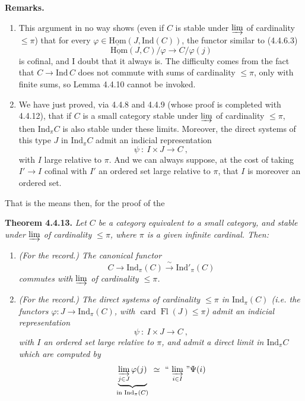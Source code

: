 \documentclass[11pt]{article}
\newcommand{\msp}[1]{\marginpar{\footnotesize [#1]}}
\newcommand{\uHom}{\underline{\mathrm{Hom}}}
\newcommand{\Ind}{\mathrm{Ind}}
\newcommand{\Fl}{\operatorname{Fl}}
\newcommand{\card}{\operatorname{card}}
\begin{document}
\textbf{Remarks.}
\begin{enumerate}[label={}, leftmargin=*]
\item[1.] This argument in no way shows (even if $C$ is stable under $\varinjlim$ of cardinality $\leqslant \pi$) that for every $\varphi \in \uHom(J,\Ind(C))$, the functor similar to (4.4.6.3)
\[
\uHom(J,C)/\varphi \longrightarrow C/\varphi(j)
\]
is cofinal, and I doubt that it always is. The difficulty comes from the fact that $C \longrightarrow \Ind\, C$ does not commute with sums of cardinality $\leqslant \pi$, only with finite sums,
\msp{page 95}
so Lemma 4.4.10 cannot be invoked.
\item[2.] We have just proved, via 4.4.8 and 4.4.9 (whose proof is completed with 4.4.12), that if $C$ is a small category stable under $\varinjlim$ of cardinality $\leqslant \pi$, then $\Ind_\pi C$ is also stable under these limits. Moreover, the direct systems of this type $J$ in $\Ind_\pi C$ admit an indicial representation
\[
\psi \ :\ I \times J \longrightarrow C\ ,
\]
with $I$ large relative to $\pi$. And we can always suppose, at the cost of taking $I' \longrightarrow I$ cofinal with $I'$ an ordered set large relative to $\pi$, that $I$ is moreover an ordered set.
\end{enumerate}

That is the means then, for the proof of the

\textbf{Theorem 4.4.13.} \textit{Let $C$ be a category equivalent to a small category, and stable under $\varinjlim$ of cardinality $\leqslant \pi$, where $\pi$ is a given infinite cardinal. Then:}
\msp{page 96}

\begin{enumerate}[label={}, leftmargin=*]
\item[\textit{a)}] \textit{(For the record.) The canonical functor}
\[
C \longrightarrow \Ind_\pi(C) \xrightarrow{\ \sim\ } \Ind'_\pi(C)
\]
\textit{commutes with $\varinjlim$ of cardinality $\leqslant \pi$.}
\item[\textit{b)}] \textit{(For the record.) The direct systems of cardinality $\leqslant \pi$ in $\Ind_\pi(C)$ (i.e. the functors $\varphi : J \longrightarrow \Ind_\pi(C)$, with $\card \Fl(J) \leqslant \pi$) admit an indicial representation}
\[
\psi \ :\ I \times J \longrightarrow C\ ,
\]
\textit{with $I$ an ordered set large relative to $\pi$, and admit a direct limit in $\Ind_\pi C$ which are computed by}
\[
\underbrace{\varinjlim_{j\in J} \varphi(j)}_{\text{in } \Ind_\pi(C)} \ \simeq\ \text{``}\,\varinjlim_{i\in I}\,\text{''}\Psi(i)
\]
\end{enumerate}
\end{document}
